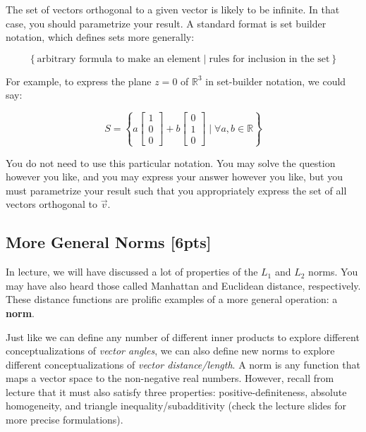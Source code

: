 \begin{hintbox}
The set of vectors orthogonal to a given vector is likely to be infinite. In that case, you should parametrize your result. A standard format is set builder notation, which defines sets more generally:

$$\left\{ \text{arbitrary formula to make an element} \;\Big|\; \text{rules for inclusion in the set}\right\}$$

For example, to express the plane $z=0$ of $\mathbb{R}^3$ in set-builder notation, we could say:

$$S = \left\{ a\begin{bmatrix}1 \\ 0 \\ 0\end{bmatrix} + b\begin{bmatrix}0 \\ 1 \\ 0\end{bmatrix} \;\Bigg|\; \forall a,b\in\mathbb{R}\right\}$$

You do not need to use this particular notation. You may solve the question however you like, and you may express your answer however you like, but you must parametrize your result such that you appropriately express the set of all vectors orthogonal to $\vec{v}$.
\end{hintbox}

\newpage



\subsection{More General Norms [6pts]}
In lecture, we will have discussed a lot of properties of the $L_1$ and $L_2$ norms. You may have also heard those called Manhattan and Euclidean distance, respectively. These distance functions are prolific examples of a more general operation: a \textbf{norm}.

Just like we can define any number of different inner products to explore different conceptualizations of \textit{vector angles}, we can also define new norms to explore different conceptualizations of \textit{vector distance/length}. A norm is any function that maps a vector space to the non-negative real numbers. However, recall from lecture that it must also satisfy three properties: positive-definiteness, absolute homogeneity, and triangle inequality/subadditivity (check the lecture slides for more precise formulations).

